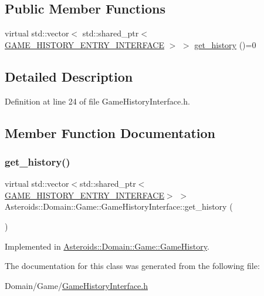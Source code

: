 \subsection*{Public Member Functions}
\begin{DoxyCompactItemize}
\item 
virtual std\+::vector$<$ std\+::shared\+\_\+ptr$<$ \hyperlink{classAsteroids_1_1Domain_1_1Game_1_1GAME__HISTORY__ENTRY__INTERFACE}{G\+A\+M\+E\+\_\+\+H\+I\+S\+T\+O\+R\+Y\+\_\+\+E\+N\+T\+R\+Y\+\_\+\+I\+N\+T\+E\+R\+F\+A\+CE} $>$ $>$ \hyperlink{classAsteroids_1_1Domain_1_1Game_1_1GameHistoryInterface_a0a992e10b08943b0ea01b862f9ffddd4}{get\+\_\+history} ()=0
\end{DoxyCompactItemize}


\subsection{Detailed Description}


Definition at line 24 of file Game\+History\+Interface.\+h.



\subsection{Member Function Documentation}
\mbox{\label{classAsteroids_1_1Domain_1_1Game_1_1GameHistoryInterface_a0a992e10b08943b0ea01b862f9ffddd4}} 
\subsubsection{\texorpdfstring{get\+\_\+history()}{get\_history()}}
{\footnotesize\ttfamily virtual std\+::vector$<$std\+::shared\+\_\+ptr$<$\hyperlink{classAsteroids_1_1Domain_1_1Game_1_1GAME__HISTORY__ENTRY__INTERFACE}{G\+A\+M\+E\+\_\+\+H\+I\+S\+T\+O\+R\+Y\+\_\+\+E\+N\+T\+R\+Y\+\_\+\+I\+N\+T\+E\+R\+F\+A\+CE}$>$ $>$ Asteroids\+::\+Domain\+::\+Game\+::\+Game\+History\+Interface\+::get\+\_\+history (\begin{DoxyParamCaption}{ }\end{DoxyParamCaption})\hspace{0.3cm}{\ttfamily [pure virtual]}}



Implemented in \hyperlink{classAsteroids_1_1Domain_1_1Game_1_1GameHistory_ad01c0196f3b831e06ae03d86d659ec6f}{Asteroids\+::\+Domain\+::\+Game\+::\+Game\+History}.



The documentation for this class was generated from the following file\+:\begin{DoxyCompactItemize}
\item 
Domain/\+Game/\hyperlink{GameHistoryInterface_8h}{Game\+History\+Interface.\+h}\end{DoxyCompactItemize}
